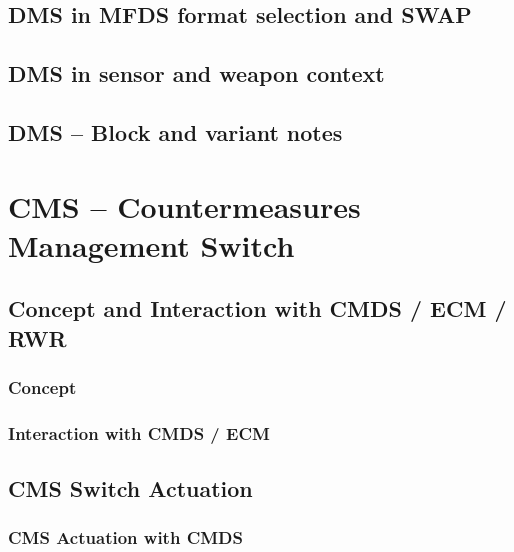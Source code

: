 \documentclass[11pt,a4paper]{article}
\begin{document}
\subsection{DMS in MFDS format selection and SWAP}


\subsection{DMS in sensor and weapon context}

\subsection{DMS -- Block and variant notes}



\section{CMS -- Countermeasures Management Switch}\label{chap:C5}

\subsection{Concept and Interaction with CMDS / ECM / RWR}\label{sec:C5-S1}

\subsubsection{Concept}\label{sec:C5-S1-S1}

\subsubsection{Interaction with CMDS / ECM}\label{sec:C5-S1-S2}

\subsection{CMS Switch Actuation}\label{sec:C5-S2}
\subsubsection{CMS Actuation with CMDS}\label{sec:C5-S2-S1}
\end{document}
